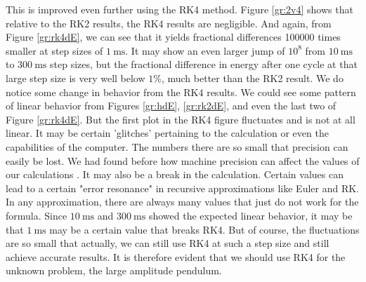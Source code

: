 \documentclass[aps,prl,twocolumn,superscriptaddress]{revtex4-1}
\begin{document}
This is improved even further using the RK4 method. Figure \ref{gr:2v4} shows that relative to the RK2 results, the RK4 results are negligible. And again, from Figure \ref{gr:rk4dE}, we can see that it yields fractional differences 100000 times smaller at step sizes of $\SI{1}{\ms}$. It may show an even larger jump of $10^{8}$ from $\SI{10}{\ms}$ to $\SI{300}{\ms}$ step sizes, but the fractional difference in energy after one cycle at that large step size is very well below $1$\%, much better than the RK2 result. We do notice some change in behavior from the RK4 results. We could see some pattern of linear behavior from Figures \ref{gr:hdE}, \ref{gr:rk2dE}, and even the last two of Figure \ref{gr:rk4dE}. But the first plot in the RK4 figure fluctuates and is not at all linear. It may be certain 'glitches' pertaining to the calculation or even the capabilities of the computer. The numbers there are so small that precision can easily be lost. We had found before how machine precision can affect the values of our calculations \cite{precision}. It may also be a break in the calculation. Certain values can lead to a certain "error resonance" in recursive approximations like Euler and RK. In any approximation, there are always many values that just do not work for the formula. Since $\SI{10}{\ms}$ and $\SI{300}{\ms}$ showed the expected linear behavior, it may be that $\SI{1}{\ms}$ may be a certain value that breaks RK4. But of course, the fluctuations are so small that actually, we can still use RK4 at such a step size and still achieve accurate results. It is therefore evident that we should use RK4 for the unknown problem, the large amplitude pendulum.
\end{document}
